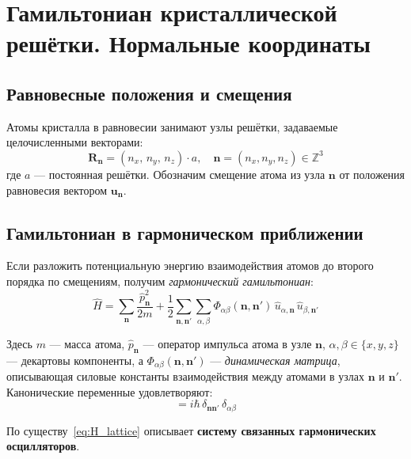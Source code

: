 \documentclass[../general/general]{subfiles}
\begin{document}


\section{Гамильтониан кристаллической решётки. Нормальные координаты}

\subsection{Равновесные положения и смещения}

Атомы кристалла в равновесии занимают узлы решётки, задаваемые целочисленными векторами:
\begin{equation}
    \mathbf{R}_\mathbf{n} = (n_x,\,n_y,\,n_z)\cdot a, \quad \mathbf{n} = (n_x,n_y,n_z) \in \mathbb{Z}^3
\end{equation}
где $a$ --- постоянная решётки. Обозначим смещение атома из узла $\mathbf{n}$ от положения равновесия вектором $\mathbf{u}_\mathbf{n}$.

\subsection{Гамильтониан в гармоническом приближении}

Если разложить потенциальную энергию взаимодействия атомов до второго порядка по смещениям, получим \emph{гармонический гамильтониан}:
\begin{equation}
    \hat{H} = \sum_{\mathbf{n}} \frac{\hat{p}_{\mathbf{n}}^2}{2m} + \frac{1}{2}\sum_{\mathbf{n},\mathbf{n}'}\sum_{\alpha,\beta} \Phi_{\alpha\beta}(\mathbf{n},\mathbf{n}')\,\hat{u}_{\alpha,\mathbf{n}}\,\hat{u}_{\beta,\mathbf{n}'}
    \label{eq:H_lattice}
\end{equation}

Здесь $m$ --- масса атома, $\hat{p}_{\mathbf{n}}$ --- оператор импульса атома в узле $\mathbf{n}$, $\alpha,\beta \in \{x,y,z\}$ --- декартовы компоненты, а $\Phi_{\alpha\beta}(\mathbf{n},\mathbf{n}')$ --- \emph{динамическая матрица}, описывающая силовые константы взаимодействия между атомами в узлах $\mathbf{n}$ и $\mathbf{n}'$. Канонические переменные удовлетворяют:
\begin{equation}
    [\hat{u}_{\alpha,\mathbf{n}},\,\hat{p}_{\beta,\mathbf{n}'}] = i\hbar\,\delta_{\mathbf{n}\mathbf{n}'}\,\delta_{\alpha\beta}
\end{equation}

По существу~\eqref{eq:H_lattice} описывает \textbf{систему связанных гармонических осцилляторов}.
\end{document}
